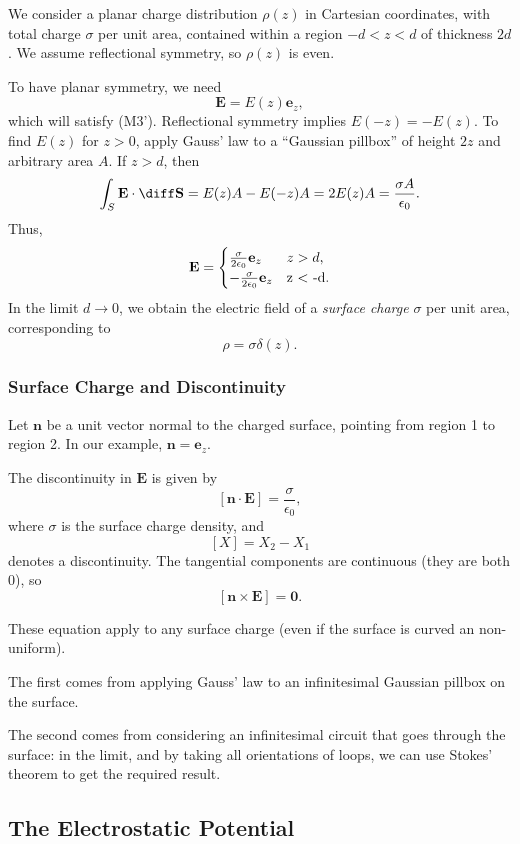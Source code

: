 \documentclass[12pt]{article}
\begin{document}
We consider a planar charge distribution $\rho(z)$ in Cartesian coordinates, with total charge $\sigma$ per unit area, contained within a region $-d < z < d$ of thickness $2d$. We assume reflectional symmetry, so $\rho(z)$ is even.

To have planar symmetry, we need
\[
\mathbf{E} = E(z) \mathbf{e}_z
,\]
which will satisfy (M3'). Reflectional symmetry implies $E(-z) = -E(z)$. To find $E(z)$ for $z > 0$, apply Gauss' law to a ``Gaussian pillbox'' of height $2z$ and arbitrary area $A$. If $z > d$, then
\[
\int_{S}\mathbf{E} \cdot \diff \mathbf{S} = E(z)A - E(-z)A = 2E(z)A = \frac{\sigma A}{\epsilon_0}
.\]
Thus,
\[
\mathbf{E} =
\begin{cases}
	\frac{\sigma}{2 \epsilon_0} \mathbf{e}_z & z > d, \\
	-\frac{\sigma}{2 \epsilon_0} \mathbf{e}_z & $z < -d$.
\end{cases}
\]
In the limit $d \to 0$, we obtain the electric field of a \emph{surface charge} $\sigma$ per unit area, corresponding to
\[
\rho = \sigma \delta(z)
.\]

\subsubsection{Surface Charge and Discontinuity}
\label{subsub:surface_charge_and_discontinuity}

Let $\mathbf{n}$ be a unit vector normal to the charged surface, pointing from region 1 to region 2. In our example, $\mathbf{n} = \mathbf{e}_z$.

The discontinuity in $\mathbf{E}$ is given by
\[
	[\mathbf{n} \cdot \mathbf{E}] = \frac{\sigma}{\epsilon_0}
,\]
where $\sigma$ is the surface charge density, and
\[
	[X] = X_2 - X_1
\]
denotes a discontinuity. The tangential components are continuous (they are both 0), so
\[
	[\mathbf{n} \times \mathbf{E}] = \mathbf{0}
.\]

These equation apply to any surface charge (even if the surface is curved an non-uniform).

The first comes from applying Gauss' law to an infinitesimal Gaussian pillbox on the surface.

The second comes from considering an infinitesimal circuit that goes through the surface: in the limit, and by taking all orientations of loops, we can use Stokes' theorem to get the required result.

\subsection{The Electrostatic Potential}
\label{sub:the_electrostatic_potential}
\end{document}
